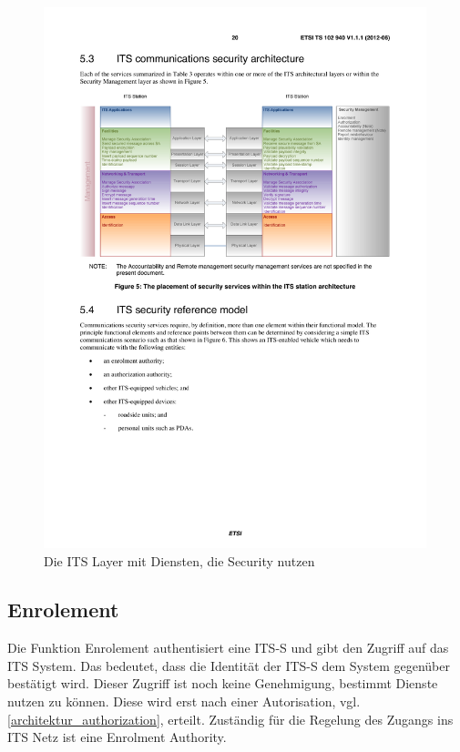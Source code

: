 \begin{figure}
	\includegraphics[width=0.99\textwidth]{content/images/02_architektur/securityDienste.pdf}
	\caption{Die ITS Layer mit Diensten, die Security nutzen \cite{ts102940}}
	\label{fig:architektur_securityDienste}
\end{figure}

\subsection{Enrolement}
Die Funktion Enrolement authentisiert eine \ac{ITS-S} und gibt den Zugriff auf das  \ac{ITS} System.  Das bedeutet, dass die Identität der \ac{ITS-S} dem System gegenüber bestätigt wird. Dieser Zugriff ist noch keine Genehmigung, bestimmt Dienste nutzen zu können. Diese wird erst nach einer Autorisation, vgl. \autoref{architektur_authorization}, erteilt. Zuständig für die Regelung des Zugangs ins \ac{ITS} Netz ist eine Enrolment Authority.

